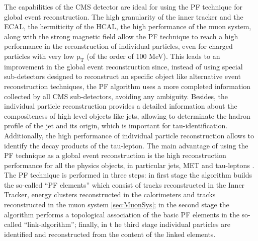 The capabilities of the CMS detector are ideal for using the PF technique for global event reconstruction. The high 
granularity of the inner tracker and the ECAL, the hermiticity of the HCAL, the high performance of the muon system, 
along with the strong magnetic field allow the PF technique to reach a 
high performance in the reconstruction of individual particles, even for charged particles
with very low $\textrm{p}_{\textrm{T}}$ (of the order of 100 MeV). This leads to an improvement in the global event 
reconstruction since, instead of using special sub-detectors designed to reconstruct an specific 
object like alternative event reconstruction techniques, the PF algorithm uses a more completed information collected 
by all CMS sub-detectors, avoiding any ambiguity. Besides, the 
individual particle reconstruction provides a detailed information 
about the compositeness of high level objects like jets, allowing to determinate the hadron 
profile of the jet and its origin, which is important for tau-identification. Additionally, the high performance of 
individual particle reconstruction allows to identify the decay products of the tau-lepton. The main advantage 
of using the PF technique as a global event reconstruction is the high reconstruction performance
for all the physics objects, in particular jets, MET and tau-leptons \cite{CMS-PAS-PFT-10-001}.\\


The PF technique is performed in three steps: in first stage the algorithm builds the so-called ``PF elements'' which consist of tracks 
reconstructed in the Inner Tracker, energy clusters reconstructed in the calorimeters and tracks reconstructed in the muon system \ref{sec:MuonSys};
in the second stage the algorithm performs a topological association of the basic PF elements in the so-called ``link-algorithm''; finally, in t
he third stage individual particles are identified and reconstructed from the content of the linked elements. \\


